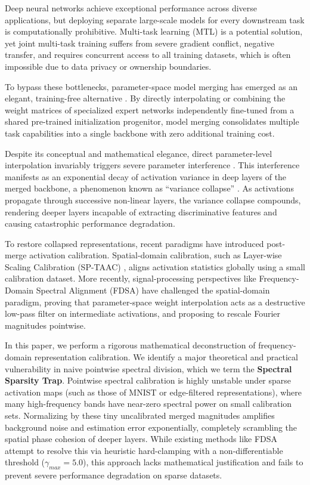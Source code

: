 \documentclass{article}
\theoremstyle{plain}
\theoremstyle{definition}
\theoremstyle{remark}
\begin{document}
Deep neural networks achieve exceptional performance across diverse applications, but deploying separate large-scale models for every downstream task is computationally prohibitive. Multi-task learning (MTL) is a potential solution, yet joint multi-task training suffers from severe gradient conflict, negative transfer, and requires concurrent access to all training datasets, which is often impossible due to data privacy or ownership boundaries.

To bypass these bottlenecks, parameter-space model merging has emerged as an elegant, training-free alternative \cite{wortsman2022model, ilharco2022editing}. By directly interpolating or combining the weight matrices of specialized expert networks independently fine-tuned from a shared pre-trained initialization progenitor, model merging consolidates multiple task capabilities into a single backbone with zero additional training cost.

Despite its conceptual and mathematical elegance, direct parameter-level interpolation invariably triggers severe parameter interference \cite{yadav2023ties, yu2024language}. This interference manifests as an exponential decay of activation variance in deep layers of the merged backbone, a phenomenon known as ``variance collapse'' \cite{jordan2022repair, submission9}. As activations propagate through successive non-linear layers, the variance collapse compounds, rendering deeper layers incapable of extracting discriminative features and causing catastrophic performance degradation.

To restore collapsed representations, recent paradigms have introduced post-merge activation calibration. Spatial-domain calibration, such as Layer-wise Scaling Calibration (SP-TAAC) \cite{submission9}, aligns activation statistics globally using a small calibration dataset. More recently, signal-processing perspectives like Frequency-Domain Spectral Alignment (FDSA) \cite{submission10} have challenged the spatial-domain paradigm, proving that parameter-space weight interpolation acts as a destructive low-pass filter on intermediate activations, and proposing to rescale Fourier magnitudes pointwise.

In this paper, we perform a rigorous mathematical deconstruction of frequency-domain representation calibration. We identify a major theoretical and practical vulnerability in naive pointwise spectral division, which we term the \textbf{Spectral Sparsity Trap}. Pointwise spectral calibration is highly unstable under sparse activation maps (such as those of MNIST or edge-filtered representations), where many high-frequency bands have near-zero spectral power on small calibration sets. Normalizing by these tiny uncalibrated merged magnitudes amplifies background noise and estimation error exponentially, completely scrambling the spatial phase cohesion of deeper layers. While existing methods like FDSA attempt to resolve this via heuristic hard-clamping with a non-differentiable threshold ($\gamma_{max} = 5.0$), this approach lacks mathematical justification and fails to prevent severe performance degradation on sparse datasets.
\end{document}
